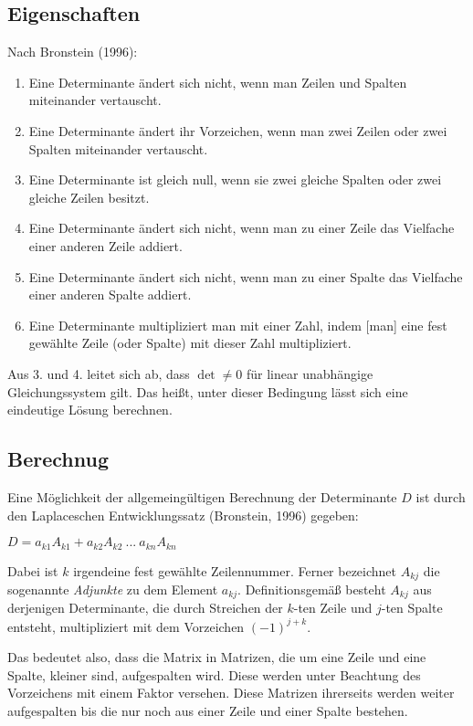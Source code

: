 \documentclass[11pt,a4paper]{article}
\begin{document}
\subsection{Eigenschaften}
Nach Bronstein (1996):
\begin{enumerate}
	\item Eine Determinante ändert sich nicht, wenn man Zeilen und Spalten miteinander vertauscht.
	\item Eine Determinante ändert ihr Vorzeichen, wenn man zwei Zeilen oder zwei Spalten miteinander vertauscht.
	\item Eine Determinante ist gleich null, wenn sie zwei gleiche Spalten oder zwei gleiche Zeilen besitzt.
	\item Eine Determinante ändert sich nicht, wenn man zu einer Zeile das Vielfache einer anderen Zeile addiert.
	\item Eine Determinante ändert sich nicht, wenn man zu einer Spalte das Vielfache einer anderen Spalte addiert.
	\item Eine Determinante multipliziert man mit einer Zahl, indem [man] eine fest gewählte Zeile (oder Spalte) mit dieser Zahl multipliziert.
\end{enumerate}

Aus 3. und 4. leitet sich ab, dass $\det \neq 0$ für linear unabhängige Gleichungssystem gilt. Das heißt, unter dieser Bedingung lässt sich eine eindeutige Lösung berechnen.

\subsection{Berechnug}
Eine Möglichkeit der allgemeingültigen Berechnung der Determinante $D$ ist durch den Laplaceschen Entwicklungssatz (Bronstein, 1996) gegeben:

$D = a_{k1} A_{k1} + a_{k2} A_{k2} ~...~ a_{kn} A_{kn}$

Dabei ist $k$ irgendeine fest gewählte Zeilennummer. Ferner bezeichnet $A_{kj}$ die sogenannte \textit{Adjunkte} zu dem Element $a_{kj}$. Definitionsgemäß besteht $A_{kj}$ aus derjenigen Determinante, die durch Streichen der $k$-ten Zeile und $j$-ten Spalte entsteht, multipliziert mit dem Vorzeichen $(-1)^{j+k}$.

Das bedeutet also, dass die Matrix in Matrizen, die um eine Zeile und eine Spalte, kleiner sind, aufgespalten wird. Diese werden unter Beachtung des Vorzeichens mit einem Faktor versehen. Diese Matrizen ihrerseits werden weiter aufgespalten bis die nur noch aus einer Zeile und einer Spalte bestehen.
\end{document}
